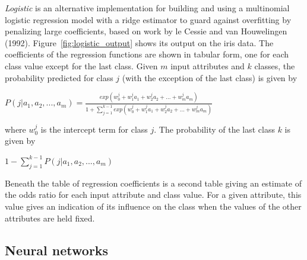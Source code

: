 \textit{Logistic} is an alternative implementation for building and
using a multinomial logistic regression model with a ridge estimator
to guard against overfitting by penalizing large coefficients, based
on work by le Cessie and van Houwelingen
(1992). Figure~\ref{fig:logistic_output} shows its output on the iris
data. The coefficients of the regression functions are shown in
tabular form, one for each class value except for the last
class. Given $m$ input attributes and $k$ classes, the probability
predicted for class $j$ (with the exception of the last class) is given
by\newline

$P(j|a_1,a_2,...,a_m)=\frac{exp(w^j_0+w^j_1a_1+w^j_2a_2+...+w^j_ma_m)}{1 + \sum_{j=1}^{k-1}exp(w^j_0+w^j_1a_1+w^j_2a_2+...+w^j_ma_m)}$\newline

where $w^j_0$ is the intercept term for class $j$. The probability of the last class $k$ is given by\newline

$1-\sum_{j=1}^{k-1}P(j|a_1,a_2,...,a_m)$\newline

Beneath the table of regression coefficients is a second table giving
an estimate of the odds ratio for each input attribute and class
value. For a given attribute, this value gives an indication of its
influence on the class when the values of the other attributes are
held fixed.

\subsection{Neural networks}

